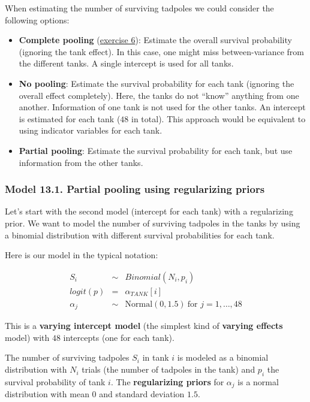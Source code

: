 \documentclass[
]{book}
\providecommand{\tightlist}{%
  \setlength{\itemsep}{0pt}\setlength{\parskip}{0pt}}
\begin{document}
When estimating the number of surviving tadpoles we could consider the following options:

\begin{itemize}
\tightlist
\item
  \textbf{Complete pooling} (\hyperref[exercise6_LMM]{exercise 6}): Estimate the overall survival probability
  (ignoring the tank effect).
  In this case, one might miss between-variance from the different tanks.
  A single intercept is used for all tanks.
\item
  \textbf{No pooling}: Estimate the survival probability for each tank (ignoring the overall effect completely).
  Here, the tanks do not ``know'' anything from one another. Information of one tank is not used for the other tanks.
  An intercept is estimated for each tank (\(48\) in total).
  This approach would be equivalent to using indicator variables for each tank.
\item
  \textbf{Partial pooling}: Estimate the survival probability for each tank,
  but use information from the other tanks.
\end{itemize}

\subsubsection{Model 13.1. Partial pooling using regularizing priors}\label{model13_1}

Let's start with the second model (intercept for each tank) with a regularizing prior.
We want to model the
number of surviving tadpoles in the tanks by using a binomial distribution with
different survival probabilities for each tank.

Here is our model in the typical notation:

\[
\begin{array}{rcl}
S_i &\sim& Binomial(N_i, p_i) \\
logit(p) &=& \alpha_{TANK}[i] \\
\alpha_j &\sim& \text{Normal}(0, 1.5)~\text{for } j=1,\ldots,48
\end{array}
\]

This is a \textbf{varying intercept model} (the simplest kind of \textbf{varying effects} model)
with \(48\) intercepts (one for each tank).

The number of surviving tadpoles \(S_i\) in tank \(i\) is modeled as a binomial distribution with
\(N_i\) trials (the number of tadpoles in the tank) and \(p_i\) the survival probability of tank \(i\).
The \textbf{regularizing priors} for \(\alpha_j\) is a normal distribution with mean \(0\) and standard deviation \(1.5\).
\end{document}
